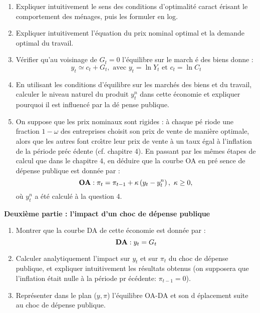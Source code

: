 \documentclass[a4paper,11pt]{article}
\begin{document}
\begin{enumerate}
\item Expliquer intuitivement le sens des conditions d'optimalit\'{e} caract%
\'{e}risant le comportement des m\'{e}nages, puis les formuler en log.

\item  Expliquer intuitivement l'\'{e}quation du prix nominal optimal et la demande optimal du travail. 


\item V\'{e}rifier qu'au voisinage de $G_{t}=0$ l'\'{e}quilibre sur le march%
\'{e} des biens donne :%
\begin{equation*}
y_{t}\simeq c_{t}+G_{t},\text{ avec }y_{t}=\ln Y_{t}\text{ et }c_{t}=\ln
C_{t}
\end{equation*}

\item En utilisant les conditions d'\'{e}quilibre sur les march\'{e}s des
biens et du travail, calculer le niveau naturel du produit $y_{t}^{n}$ dans
cette \'{e}conomie et expliquer pourquoi il est influenc\'{e} par la d\'{e}%
pense publique.

\item On suppose que les prix nominaux sont rigides : \`{a} chaque p\'{e}%
riode une fraction $1-\omega $ des entreprises choisit son prix de vente de
mani\`{e}re optimale, alors que les autres font cro\^{\i}tre leur prix de
vente \`{a} un taux \'{e}gal \`{a} l'inflation de la p\'{e}riode pr\'{e}c%
\'{e}dente (cf. chapitre 4). En passant par les m\^{e}mes \'{e}tapes de
calcul que dans le chapitre 4, en d\'{e}duire que la courbe OA en pr\'{e}%
sence de d\'{e}pense publique est donn\'{e}e par :%
\begin{equation*}
\text{\textbf{OA}}:\pi _{t}=\pi _{t-1}+\kappa \left( y_{t}-y_{t}^{n}\right)
,\ \kappa \geq 0,
\end{equation*}%
o\`{u} $y_{t}^{n}$ a \'{e}t\'{e} calcul\'{e} \`{a} la question 4.
\end{enumerate}

\bigskip

\noindent \textbf{Deuxi\`{e}me partie : l'impact d'un choc de d\'{e}pense
publique}

\begin{enumerate}
\item Montrer que la courbe DA de cette \'{e}conomie est donn\'{e}e par : 
\begin{equation*}
\text{\textbf{DA}}:y_{t}=G_{t}
\end{equation*}

\item Calculer analytiquement l'impact sur $y_{t}$ et sur $\pi _{t}$ du choc
de d\'{e}pense publique, et expliquer intuitivement les r\'{e}sultats
obtenus (on supposera que l'inflation \'{e}tait nulle \`{a} la p\'{e}riode pr%
\'{e}c\'{e}dente: $\pi _{t-1}=0$).

\item Repr\'{e}senter dans le plan ($y,\pi $) l'\'{e}quilibre OA-DA et son d%
\'{e}placement suite au choc de d\'{e}pense publique.
\end{enumerate}
\end{document}
